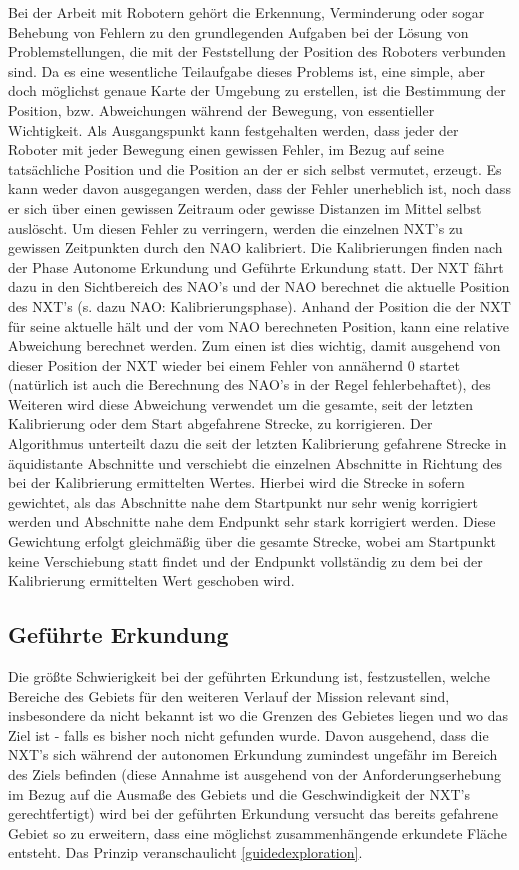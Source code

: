 Bei der Arbeit mit Robotern gehört die Erkennung, Verminderung oder sogar Behebung von Fehlern zu den grundlegenden Aufgaben bei der Lösung von Problemstellungen, die mit der Feststellung der Position des Roboters verbunden sind. Da es eine wesentliche Teilaufgabe dieses Problems ist, eine simple, aber doch möglichst genaue Karte der Umgebung zu erstellen, ist die Bestimmung der Position, bzw. Abweichungen während der Bewegung, von essentieller Wichtigkeit.
Als Ausgangspunkt kann festgehalten werden, dass jeder der Roboter mit jeder Bewegung einen gewissen Fehler, im Bezug auf seine tatsächliche Position und die Position an der er sich selbst vermutet, erzeugt. Es kann weder davon ausgegangen werden, dass der Fehler unerheblich ist, noch dass er sich über einen gewissen Zeitraum oder gewisse Distanzen im Mittel selbst auslöscht. Um diesen Fehler zu verringern, werden die einzelnen NXT's zu gewissen Zeitpunkten durch den NAO kalibriert. Die Kalibrierungen finden nach der Phase Autonome Erkundung und Geführte Erkundung statt. Der NXT fährt dazu in den Sichtbereich des NAO's und der NAO berechnet die aktuelle Position des NXT's (s. dazu NAO: Kalibrierungsphase). Anhand der Position die der NXT für seine aktuelle hält und der vom NAO berechneten Position, kann eine relative Abweichung berechnet werden. Zum einen ist dies wichtig, damit ausgehend von dieser Position der NXT wieder bei einem Fehler von annähernd 0 startet (natürlich ist auch die Berechnung des NAO's in der Regel fehlerbehaftet), des Weiteren wird diese Abweichung verwendet um die gesamte, seit der letzten Kalibrierung oder dem Start abgefahrene Strecke, zu korrigieren. Der Algorithmus unterteilt dazu die seit der letzten Kalibrierung gefahrene Strecke in äquidistante Abschnitte und verschiebt die einzelnen Abschnitte in Richtung des bei der Kalibrierung ermittelten Wertes. Hierbei wird die Strecke in sofern gewichtet, als das Abschnitte nahe dem Startpunkt nur sehr wenig korrigiert werden und Abschnitte nahe dem Endpunkt sehr stark korrigiert werden. Diese Gewichtung erfolgt gleichmäßig über die gesamte Strecke, wobei am Startpunkt keine Verschiebung statt findet und der Endpunkt vollständig zu dem bei der Kalibrierung ermittelten Wert geschoben wird.

\subsection{Geführte Erkundung}

Die größte Schwierigkeit bei der geführten Erkundung ist, festzustellen, welche Bereiche des Gebiets für den weiteren Verlauf der Mission relevant sind, insbesondere da nicht bekannt ist wo die Grenzen des Gebietes liegen und wo das Ziel ist - falls es bisher noch nicht gefunden wurde. Davon ausgehend, dass die NXT's sich während der autonomen Erkundung zumindest ungefähr im Bereich des Ziels befinden (diese Annahme ist ausgehend von der Anforderungserhebung im Bezug auf die Ausmaße des Gebiets und die Geschwindigkeit der NXT's gerechtfertigt) wird bei der geführten Erkundung versucht das bereits gefahrene Gebiet so zu erweitern, dass eine möglichst zusammenhängende erkundete Fläche entsteht. Das Prinzip veranschaulicht \ref{guidedexploration}.



